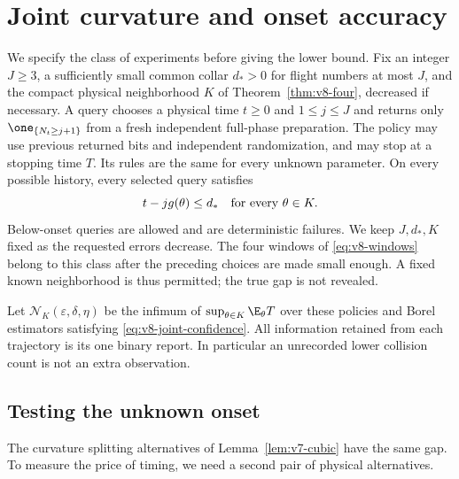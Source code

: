 \section{Joint curvature and onset accuracy}
\label{sec:v8-joint}
We specify the class of experiments before giving the lower bound.
Fix an integer $J\ge3$, a sufficiently small common collar $d_*>0$ for
flight numbers at most $J$, and the compact physical neighborhood $K$
of Theorem~\ref{thm:v8-four}, decreased if necessary. A query chooses a
physical time $t\ge0$ and $1\le j\le J$ and returns only
$\one_{\{N_t\ge j+1\}}$ from a fresh independent full-phase preparation.
The policy may use previous returned bits and independent randomization,
and may stop at a stopping time $T$. Its rules are the same for every
unknown parameter. On every possible history, every selected query
satisfies
\begin{equation}\label{eq:v8-design}
                         t-jg(\theta)\le d_*
                         \quad\hbox{for every }\theta\in K.
\end{equation}
Below-onset queries are allowed and are deterministic failures. We keep
$J,d_*,K$ fixed as the requested errors decrease. The four windows of
\eqref{eq:v8-windows} belong to this class after the preceding choices
are made small enough. A fixed known neighborhood is thus permitted;
the true gap is not revealed.

Let $\mathcal N_K(\varepsilon,\delta,\eta)$ be the infimum of
$\sup_{\theta\in K}\E_\theta T$ over these policies and Borel
estimators satisfying \eqref{eq:v8-joint-confidence}. All information
retained from each trajectory is its one binary report. In particular
an unrecorded lower collision count is not an extra observation.

\subsection{Testing the unknown onset}
The curvature splitting alternatives of Lemma~\ref{lem:v7-cubic}
have the same gap. To measure the price of timing, we need a second
pair of physical alternatives.

